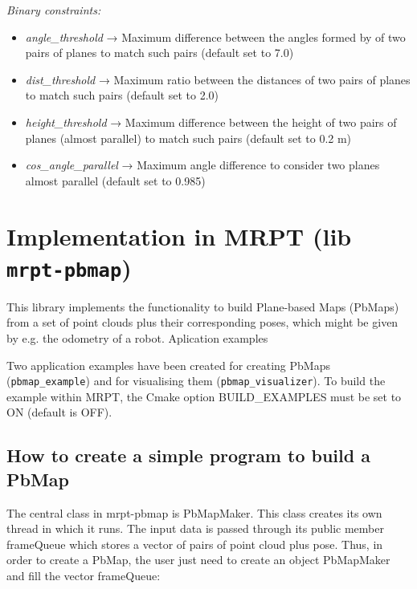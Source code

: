 \documentclass[a4paper,11pt]{article}
\begin{document}
\emph{Binary constraints:}
\begin{itemize}
\item \emph{angle\_threshold} → Maximum difference between the angles formed by of two pairs of planes to match such pairs (default set to 7.0)
\item \emph{dist\_threshold} → Maximum ratio between the distances of two pairs of planes to match such pairs (default set to 2.0)
\item \emph{height\_threshold} → Maximum difference between the height of two pairs of planes (almost parallel) to match such pairs (default set to 0.2 m)
\item \emph{cos\_angle\_parallel} → Maximum angle difference to consider two planes almost parallel (default set to 0.985)
\end{itemize}



\section{Implementation in MRPT (lib \texttt{mrpt-pbmap})}
\label{sect:implementation}

This library implements the functionality to build Plane-based Maps (PbMaps) from a set of point clouds plus their corresponding poses, which might be given by e.g. the odometry of a robot.
Aplication examples

Two application examples have been created for creating PbMaps \\ (\texttt{pbmap\_example}) and for visualising them (\texttt{pbmap\_visualizer}). To build the example within MRPT, the Cmake option BUILD\_EXAMPLES must be set to ON (default is OFF).

\subsection{How to create a simple program to build a PbMap}

The central class in mrpt-pbmap is PbMapMaker. This class creates its own thread in which it runs. The input data is passed through its public member frameQueue which stores a vector of pairs of point cloud plus pose. Thus, in order to create a PbMap, the user just need to create an object PbMapMaker and fill the vector frameQueue:
\end{document}
